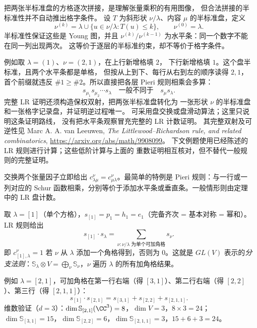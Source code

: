 \begin{note}[LR 计数证明的范围与水平条条件]
把两张半标准盘的方格逐次拼接，是理解张量乘积的有用图像，
但合法拼接的半标准性并不自动推出格字条件。
设 $T$ 为斜形状 $\nu/\lambda$、内容 $\mu$ 的半标准盘，定义
\[
\nu^{(k)}=\lambda\cup\{u\in\nu/\lambda:T(u)\le k\},
\qquad \nu^{(0)}=\lambda.
\]
半标准性保证这些是 Young 图，并且
$\nu^{(k)}/\nu^{(k-1)}$ 为水平条：同一个数字不能在同一列出现两次。
这等价于逐层的半标准约束，却不等价于格字条件。

例如取 $\lambda=(1)$、$\nu=(2,1)$，在上行新增格填 $2$，
下行新增格填 $1$。这个盘半标准，且两个水平条都是单格，
但按从上到下、每行从右到左的顺序读得 $2,1$，首个前缀就违反
$\#1\ge\#2$。所以直接把各层 Pieri 规则相乘会多算：
\[
s_{\mu_1}s_{\mu_2}\cdots s_\lambda
\quad\text{一般不同于}\quad s_\mu s_\lambda.
\]
完整 LR 证明还须构造保权双射，把两张半标准盘转化为
一张形状 $\nu$ 的半标准盘和一张格字记录盘，并证明逆过程唯一。
可采用盘交换或盘滑动算法；这里只说明这条证明路线，
没有把水平条观察冒充完整的 LR 计数证明。
其完整双射及可逆性见 Marc A. A. van Leeuwen,
\emph{The Littlewood--Richardson rule, and related combinatorics},
\url{https://arxiv.org/abs/math/9908099}。
下文例题使用已经陈述的 LR 规则进行计算；这些低阶计算与上面的
重数证明相互核对，但不替代一般规则的完整证明。
\end{note}



交换两个张量因子立即给出 $c_{\lambda\mu}^{\nu}=c_{\mu\lambda}^{\nu}$。最简单的特例是 Pieri 规则：与一行或一列对应的 Schur 函数相乘，分别等价于添加水平条或垂直条。一般情形则由定理中的 LR 盘计数。

\begin{example}
取 $\lambda=[1]$（单个方格），$s_{[1]}=p_1=h_1=e_1$（完备齐次 = 基本对称 = 幂和）。LR 规则给出
\[
s_{[1]}\cdot s_\lambda=\sum_{\nu:\nu/\lambda\text{ 为单个可加角格}}s_\nu.
\]
即 $c_{[1],\lambda}^\nu=1$ 若 $\nu$ 从 $\lambda$ 添加一个角格得到，否则为 $0$。这就是 $GL(V)$ 表示的\emph{分支法则}：$\mathbb{S}_\lambda\otimes V=\bigoplus_\nu\mathbb{S}_\nu$，$\nu$ 遍历 $\lambda$ 的所有加角格结果。

例如 $\lambda=[2,1]$，可加角格在第一行右端（得 $[3,1]$）、第二行右端（得 $[2,2]$）、第三行（得 $[2,1,1]$）：
\[
s_{[1]}\cdot s_{[2,1]}=s_{[3,1]}+s_{[2,2]}+s_{[2,1,1]}.
\]
维数验证（$d=3$）：$\dim\mathbb{S}_{[2,1]}(\CC^3)=8$，$\dim V=3$，$8\times3=24$；$\dim\mathbb{S}_{[3,1]}=15$，$\dim\mathbb{S}_{[2,2]}=6$，$\dim\mathbb{S}_{[2,1,1]}=3$，$15+6+3=24$。
\end{example}


